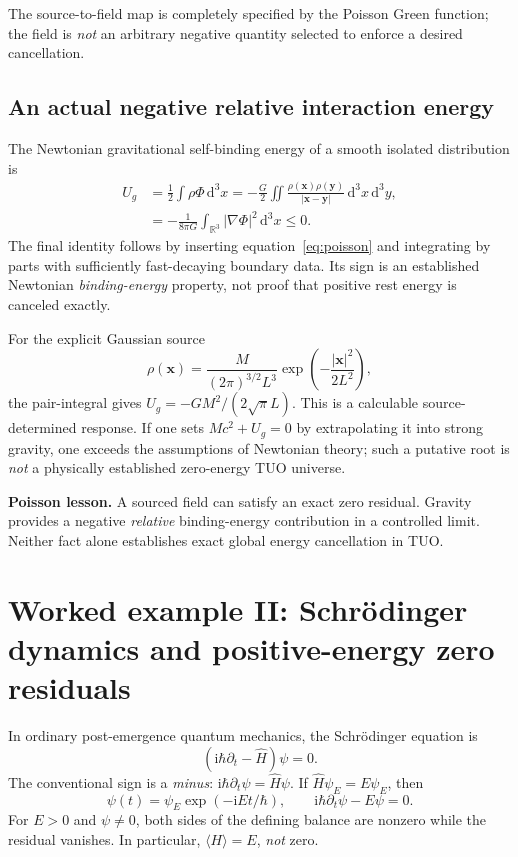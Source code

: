 \documentclass[11pt,a4paper]{article}
\newcommand{\R}{\mathbb{R}}
\newcommand{\dd}{\mathrm{d}}
\newcommand{\ii}{\mathrm{i}}
\newcommand{\ave}[1]{\langle #1\rangle}
\theoremstyle{tmon}
\theoremstyle{definition}
\begin{document}
The source-to-field map is completely specified by the Poisson Green function; the field is \emph{not} an arbitrary negative quantity selected to enforce a desired cancellation.

\subsection{An actual negative relative interaction energy}
The Newtonian gravitational self-binding energy of a smooth isolated distribution is
\begin{align}
U_g&=\frac12\int\rho\Phi\,\dd^3x
=-\frac{G}{2}\iint\frac{\rho(\bm x)\rho(\bm y)}{|\bm x-\bm y|}\,\dd^3x\,\dd^3y,\\
&=\boxed{-\frac{1}{8\pi G}\int_{\R^3}|\nabla\Phi|^2\,\dd^3x\le0.}\label{eq:gravenergy}
\end{align}
The final identity follows by inserting equation~\eqref{eq:poisson} and integrating by parts with sufficiently fast-decaying boundary data. Its sign is an established Newtonian \emph{binding-energy} property, not proof that positive rest energy is canceled exactly.

For the explicit Gaussian source
\begin{equation}
\rho(\bm x)=\frac{M}{(2\pi)^{3/2}L^3}\exp\!\left(-\frac{|\bm x|^2}{2L^2}\right),
\end{equation}
the pair-integral gives $U_g=-GM^2/(2\sqrt\pi L)$. This is a calculable source-determined response. If one sets $Mc^2+U_g=0$ by extrapolating it into strong gravity, one exceeds the assumptions of Newtonian theory; such a putative root is \emph{not} a physically established zero-energy TUO universe.

\begin{keybox}
\textbf{Poisson lesson.} A sourced field can satisfy an exact zero residual. Gravity provides a negative \emph{relative} binding-energy contribution in a controlled limit. Neither fact alone establishes exact global energy cancellation in TUO.
\end{keybox}

\section{Worked example II: Schr\"odinger dynamics and positive-energy zero residuals}
In ordinary post-emergence quantum mechanics, the Schr\"odinger equation is
\begin{equation}\label{eq:schr}
\boxed{(\ii\hbar\partial_t-\widehat H)\psi=0.}
\end{equation}
The conventional sign is a \emph{minus}: $\ii\hbar\partial_t\psi=\widehat H\psi$. If $\widehat H\psi_E=E\psi_E$, then
\begin{equation}
\psi(t)=\psi_E\exp(-\ii Et/\hbar),\qquad
\ii\hbar\partial_t\psi-E\psi=0.
\end{equation}
For $E>0$ and $\psi\neq0$, both sides of the defining balance are nonzero while the residual vanishes. In particular, $\ave{H}=E$, \emph{not} zero.
\end{document}
